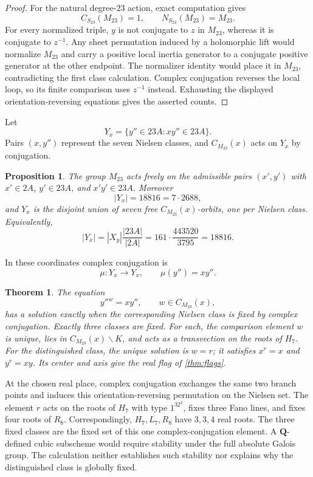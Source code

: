 \documentclass[11pt]{amsart}
\newtheorem{theorem}{Theorem}[section]
\newtheorem{proposition}[proposition]{Proposition}
\theoremstyle{definition}
\theoremstyle{remark}
\newcommand{\QQ}{\mathbf Q}
\newcommand{\Mtt}{M_{23}}
\newcommand{\Cx}{C_{M_{23}}(x)}
\begin{document}
\begin{proof}
For the natural degree-$23$ action, exact computation gives
\[
 C_{S_{23}}(M_{23})=1,
 \qquad N_{S_{23}}(M_{23})=M_{23}.
\]
For every normalized triple, $y$ is not conjugate to $z$ in $M_{23}$,
whereas it is conjugate to $z^{-1}$.  Any sheet permutation induced by a
holomorphic lift would normalize $M_{23}$ and carry a positive local
inertia generator to a conjugate positive generator at the other endpoint.
The normalizer identity would place it in $M_{23}$, contradicting the first
class calculation.  Complex conjugation reverses the local loop, so its
finite comparison uses $z^{-1}$ instead.  Exhausting the displayed
orientation-reversing equations gives the asserted counts.
\end{proof}

Let
\[
 Y_x=\{y''\in23A:xy''\in23A\}.
\]
Pairs $(x,y'')$ represent the seven Nielsen classes, and $\Cx$ acts on
$Y_x$ by conjugation.

\begin{proposition}\label{prop:torsor}
The group $\Mtt$ acts freely on the admissible pairs
$(x',y')$ with $x'\in2A$, $y'\in23A$, and $x'y'\in23A$.  Moreover
\[
 |Y_x|=18816=7\cdot2688,
\]
and $Y_x$ is the disjoint union of seven free $\Cx$-orbits, one per Nielsen
class.  Equivalently,
\[
 |Y_x|=|X_y|\frac{|23A|}{|2A|}
 =161\cdot\frac{443520}{3795}=18816.
\]
\end{proposition}

In these coordinates complex conjugation is
\[
 \mu:Y_x\longrightarrow Y_x,\qquad \mu(y'')=xy''.
\]

\begin{theorem}\label{thm:complex-conjugation}
The equation
\[
 y''{}^w=xy'',\qquad w\in\Cx,
\]
has a solution exactly when the corresponding Nielsen class is fixed by
complex conjugation.  Exactly three classes are fixed.  For each, the
comparison element $w$ is unique, lies in $\Cx\smallsetminus K$, and acts as
a transvection on the roots of $H_7$.  For the distinguished class, the unique
solution is $w=r$; it satisfies $x^r=x$ and $y^r=xy$.  Its center and axis
give the real flag of \cref{thm:flags}.
\end{theorem}

At the chosen real place, complex conjugation exchanges the same two branch
points and induces this orientation-reversing permutation on the Nielsen set.
The element $r$ acts on the roots of $H_7$ with type $1^32^2$, fixes three
Fano lines, and fixes four roots of $R_8$.  Correspondingly, $H_7,L_7,R_8$
have $3,3,4$ real roots.  The three fixed classes are the fixed set of this
one complex-conjugation element.  A $\QQ$-defined cubic subscheme would
require stability under the full absolute Galois group.  The calculation
neither establishes such stability nor explains why the distinguished class
is globally fixed.
\end{document}
